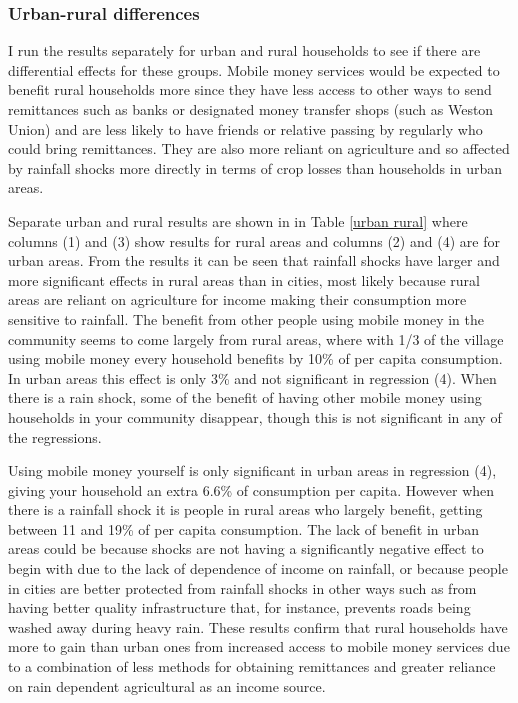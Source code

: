 

\subsubsection{Urban-rural differences}
I run the results separately for urban and rural households to see if there are differential effects for these groups. Mobile money services would be expected to benefit rural households more since they have less access to other ways to send remittances such as banks or designated money transfer shops (such as Weston Union) and are less likely to have friends or relative passing by regularly who could bring remittances. They are also more reliant on agriculture and so affected by rainfall shocks more directly in terms of crop losses than households in urban areas. 

Separate urban and rural results are shown in in Table \ref{urban rural} where columns (1) and (3) show results for rural areas and columns (2) and (4) are for urban areas. From the results it can be seen that rainfall shocks have larger and more significant effects in rural areas than in cities, most likely because rural areas are reliant on agriculture for income making their consumption more sensitive to rainfall. The benefit from other people using mobile money in the community seems to come largely from rural areas, where with 1/3 of the village using mobile money every household benefits by 10\% of per capita consumption. In urban areas this effect is only 3\% and not significant in regression (4). When there is a rain shock, some of the benefit of having other mobile money using households in your community disappear, though this is not significant in any of the regressions.  



Using mobile money yourself is only significant in urban areas in regression (4), giving your household an extra 6.6\% of consumption per capita. However when there is a rainfall shock it is people in rural areas who largely benefit, getting between 11 and 19\% of per capita consumption. The lack of benefit in urban areas could be because shocks are not having a significantly negative effect to begin with due to the lack of dependence of income on rainfall, or because people in cities are better protected from rainfall shocks in other ways such as from having better quality infrastructure that, for instance, prevents roads being washed away during heavy rain. These results confirm that rural households have more to gain than urban ones from increased access to mobile money services due to a combination of less methods for obtaining remittances and greater reliance on rain dependent agricultural as an income source. 

